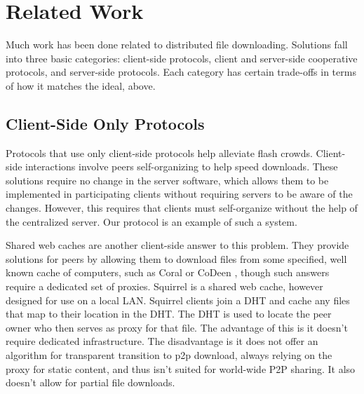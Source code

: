 \section{Related Work}\label{section:related_work}
Much work has been done related to distributed file downloading.  Solutions fall into three basic categories: client-side protocols, client and server-side cooperative protocols, and server-side protocols.  Each category has certain trade-offs in terms of how it matches the ideal, above.

\subsection{Client-Side Only Protocols}
Protocols that use only client-side protocols help alleviate flash crowds.  Client-side interactions involve peers self-organizing to help speed downloads.  These solutions require no change in the server software, which allows them to be implemented in participating clients without requiring servers to be aware of the changes.  However, this requires that clients must self-organize without the help of the centralized server.  Our protocol is an example of such a system.

Shared web caches are another client-side answer to this problem.  They provide solutions for peers by allowing them to download files from some specified, well known cache of computers, such as Coral \cite{coral} or CoDeen \cite{codeen}, though such answers require a dedicated set of proxies.  Squirrel \cite{squirrel} is a shared web cache, however designed for use on a local LAN.  Squirrel clients join a DHT and cache any files that map to their location in the DHT.  The DHT is used to locate the peer owner who then serves as proxy for that file.  The advantage of this is it doesn't require dedicated infrastructure.  The disadvantage is it does not offer an algorithm for transparent transition to p2p download, always relying on the proxy for static content, and thus isn't suited for world-wide P2P sharing.  It also doesn't allow for partial file downloads.

